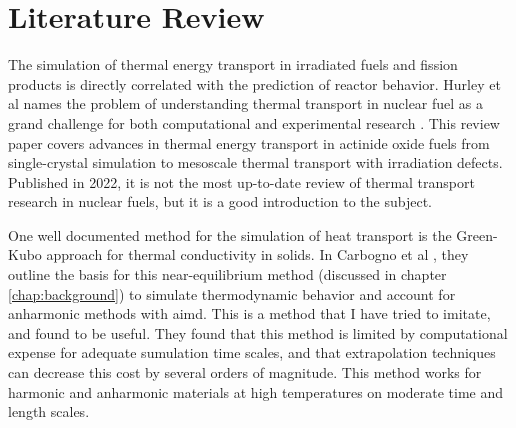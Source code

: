 
\chapter{Literature Review}

The simulation of thermal energy transport in irradiated fuels and fission products is directly correlated with the prediction of reactor behavior. Hurley et al names the problem of understanding thermal transport in nuclear fuel as a grand challenge for both computational and experimental research \autocite{hurleyThermalEnergyTransport2022}. This review paper covers advances in thermal energy transport in actinide oxide fuels from single-crystal simulation to mesoscale thermal transport with irradiation defects. Published in 2022, it is not the most up-to-date review of thermal transport research in nuclear fuels, but it is a good introduction to the subject.

One well documented method for the simulation of heat transport is the Green-Kubo approach for thermal conductivity in solids. In Carbogno et al \autocite{carbognoInitioGreenKuboApproach2017}, they outline the basis for this near-equilibrium method (discussed in chapter \ref{chap:background}) to simulate thermodynamic behavior and account for anharmonic methods with \gls{aimd}. This is a method that I have tried to imitate, and found to be useful. They found that this method is limited by computational expense for adequate sumulation time scales, and that extrapolation techniques can decrease this cost by several orders of magnitude. This method works for harmonic and anharmonic materials at high temperatures on moderate time and length scales.

